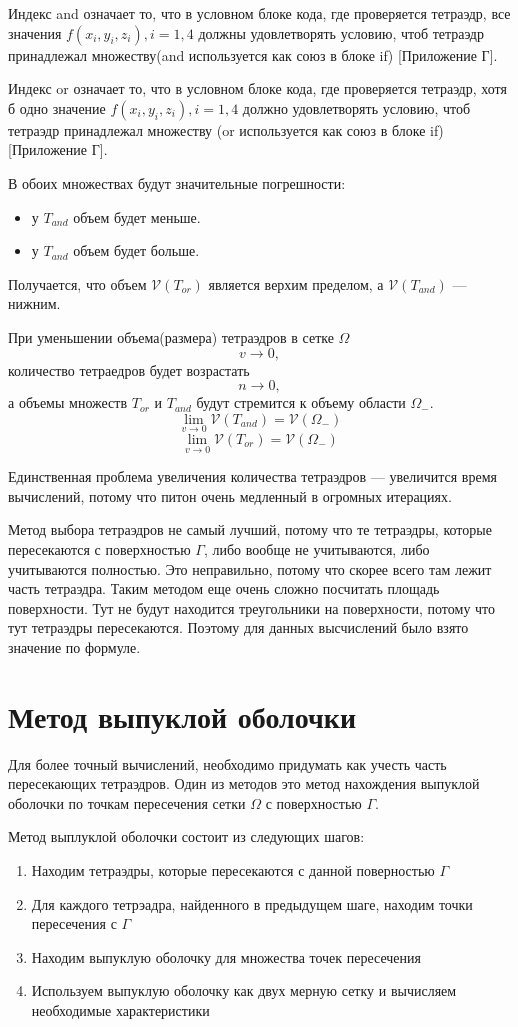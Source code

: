 Индекс and означает то, что в условном блоке кода, где проверяется тетраэдр, все значения $f(x_{i},y_{i},z_{i}), i = {1,4}$ должны удовлетворять условию, чтоб тетраэдр принадлежал множеству(and используется как союз в блоке if) [Приложение Г].

Индекс or означает то, что в условном блоке кода, где проверяется тетраэдр, хотя б одно значение $f(x_{i},y_{i},z_{i}), i = {1,4}$ должно удовлетворять условию, чтоб тетраэдр принадлежал множеству (or используется как союз в блоке if) [Приложение Г].

В обоих множествах будут значительные погрешности:
\begin{itemize}
    \item у $T_{and}$ объем будет меньше.
    \item у $T_{and}$ объем будет больше.
\end{itemize}
Получается, что объем $\mathscr{V}(T_{or})$ является верхим пределом, а  $\mathscr{V}(T_{and})$ --- нижним.

При уменьшении объема(размера) тетраэдров в сетке $\Omega$ 
$$v \rightarrow 0,$$ количество тетраедров будет возрастать
$$n \rightarrow 0,$$
а объемы множеств $T_{or}$ и $T_{and}$ будут стремится к объему области $\Omega_{-}$. 
$$ \lim_{v\to 0 }\mathscr{V}(T_{and}) = \mathscr{V}(\Omega_{-})$$
$$ \lim_{v\to 0 }\mathscr{V}(T_{or}) = \mathscr{V}(\Omega_{-})$$

Единственная проблема увеличения количества тетраэдров --- увеличится время вычислений, потому что питон очень медленный в огромных итерациях. 


Метод выбора тетраэдров не самый лучший, потому что те тетраэдры, которые пересекаются с поверхностью $\Gamma$, либо вообще не учитываются, либо учитываются полностью. Это неправильно, потому что скорее всего там лежит часть тетраэдра. Таким методом еще очень сложно посчитать площадь поверхности. Тут не будут находится треугольники на поверхности, потому что тут тетраэдры пересекаются. Поэтому для данных высчислений было взято значение по формуле.
\section{Метод выпуклой оболочки}

Для более точный вычислений, необходимо придумать как учесть часть пересекающих тетраэдров. Один из методов это метод нахождения выпуклой оболочки по точкам пересечения сетки $\Omega$ с поверхностью $\Gamma$.

Метод выплуклой оболочки состоит из следующих шагов:
\begin{enumerate}
    \item Находим тетраэдры, которые пересекаются с данной поверностью $\Gamma$ 
    \item Для каждого тетрэадра, найденного в предыдущем шаге, находим точки пересечения с $\Gamma$
    \item Находим выпуклую оболочку для множества точек пересечения
    \item Используем выпуклую оболочку как двух мерную сетку и вычисляем необходимые характеристики
\end{enumerate}

